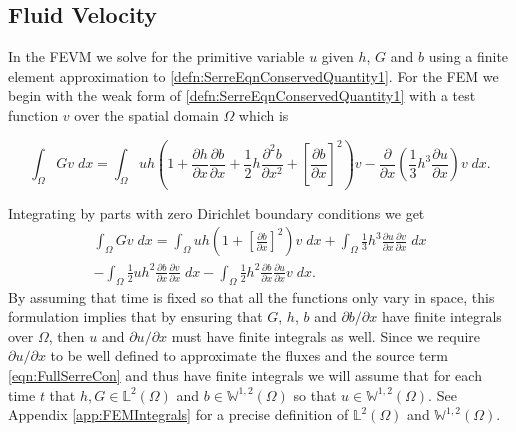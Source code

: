\subsection{Fluid Velocity}
\label{subsec:FluidVelocity}
In the FEVM we solve for the primitive variable $u$ given $h$, $G$ and $b$ using a finite element approximation to \eqref{defn:SerreEqnConservedQuantity1}. For the FEM we begin with the weak form of \eqref{defn:SerreEqnConservedQuantity1} with a test function $v$ over the spatial domain $\Omega$ which is 

\begin{equation*}
	\int_{\Omega } G v \; dx =  \int_{\Omega } uh \left(1 + \frac{\partial h}{\partial x}\frac{\partial b}{\partial x} + \frac{1}{2}h\frac{\partial^2 b}{\partial x^2} +  \left[\frac{\partial b}{\partial x}\right]^2 \right) v - \frac{\partial}{\partial x}\left(\frac{1}{3}h^3  \frac{\partial {u}}{\partial x}\right) v \; dx.
\end{equation*}

Integrating by parts with zero Dirichlet boundary conditions we get
\begin{multline}
\int_{\Omega } G v \; dx = \int_{\Omega } uh \left(1 + \left[\frac{\partial b}{\partial x}\right]^2 \right) v \; dx +  \int_{\Omega } \frac{1}{3}h^3  \frac{\partial {u}}{\partial x} \frac{\partial v}{\partial x} \; dx  \\ - 
\int_{\Omega }   \frac{1}{2} u h^2\frac{\partial b}{\partial x}  \frac{\partial v }{\partial x}\; dx - 
\int_{\Omega }   \frac{1}{2}h^2\frac{\partial b}{\partial x}  \frac{\partial u }{\partial x}v \; dx.
\label{eqn:WeakFormDomain}
\end{multline}
By assuming that time is fixed so that all the functions only vary in space, this formulation implies that by ensuring that $G$, $h$, $b$ and $\partial b / \partial x$ have finite integrals over $\Omega$, then $u$ and $\partial u / \partial x$ must have finite integrals as well. Since we require $\partial u / \partial x$ to be well defined to approximate the fluxes and the source term \eqref{eqn:FullSerreCon} and thus have finite integrals we will assume that for each time $t$ that $h,G \in \mathbb{L}^2(\Omega)$ and $b \in\mathbb{W}^{1,2}(\Omega)$ so that $u \in \mathbb{W}^{1,2}(\Omega)$. See Appendix \ref{app:FEMIntegrals} for a precise definition of $\mathbb{L}^2(\Omega)$ and $\mathbb{W}^{1,2}(\Omega)$.

